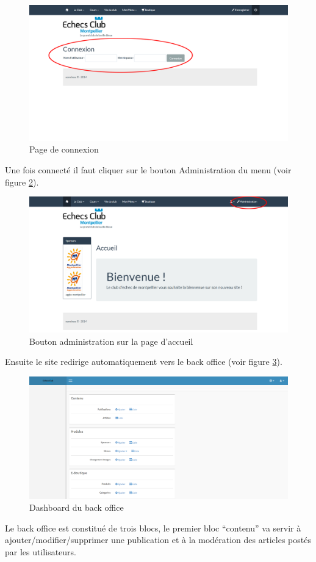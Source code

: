 \documentclass[a4paper,12pt, notitlepage]{report}
\begin{document}
\begin{figure} 
    \caption{Page de connexion}  
    \label{connexion}
    \centering
    \includegraphics[scale=0.3]{images/connexion.png}
\end{figure}
Une fois connecté il faut cliquer sur le bouton Administration du menu (voir figure \ref{accueil-btn-admin}).
\begin{figure} 
    \caption{Bouton administration sur la page d'accueil}  
    \label{accueil-btn-admin}
    \centering
    \includegraphics[scale=0.3]{images/btn-admin.png}
\end{figure}
Ensuite le site redirige automatiquement vers le back office (voir figure \ref{backoffice}).

\begin{figure} 
    \caption{Dashboard du back office}  
    \label{backoffice}
    \centering
    \includegraphics[scale=0.3]{images/backoffice.png}
\end{figure}
Le back office est constitué de trois blocs, le premier bloc “contenu” va servir à ajouter/modifier/supprimer une publication et à la modération des articles postés par les utilisateurs.
\end{document}

